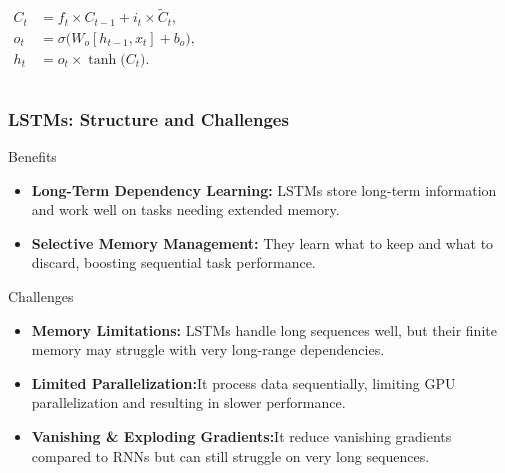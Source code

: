 \documentclass{beamer}
\begin{document}
\begin{frame}
\begin{columns}[T]
        {\small
        \[
        \begin{aligned}
            C_t &= f_t \times C_{t-1} + i_t \times \tilde{C}_t,\\[5pt]
            o_t &= \sigma\bigl(W_o [h_{t-1}, x_t] + b_o\bigr),\\[5pt]
            h_t &= o_t \times \tanh\bigl(C_t\bigr).
        \end{aligned}
        \]
        }
    \end{columns}
\end{frame}
\begin{frame}
    \frametitle{LSTMs: Structure and Challenges}
    \begin{block}{Benefits}
        \begin{itemize}
            \item \textbf{Long-Term Dependency Learning:} LSTMs store long-term information and work well on tasks needing extended memory.
            \item \textbf{Selective Memory Management:} They learn what to keep and what to discard, boosting sequential task performance.
        \end{itemize}
    \end{block}
    
    \vspace{0cm} %
    
    \begin{block}{Challenges}
        \begin{itemize}
            \item \textbf{Memory Limitations:} LSTMs handle long sequences well, but their finite memory may struggle with very long-range dependencies.
            \item \textbf{Limited Parallelization:}It process data sequentially, limiting GPU parallelization and resulting in slower performance.
            \item \textbf{Vanishing \& Exploding Gradients:}It reduce vanishing gradients compared to RNNs but can still struggle on very long sequences.
        \end{itemize}
    \end{block}
\end{frame}
\end{document}
